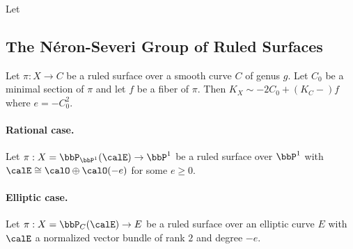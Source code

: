     \begin{theorem}\label{thm:classification_of_ruled_surface_on_elliptic_curve}
        Let 
        
    \end{theorem}


\subsection{The N\'eron-Severi Group of Ruled Surfaces}

    \begin{proposition}\label{prop:canonical_divisor_of_ruled_surface}
        Let \(\pi:X \to C\) be a ruled surface over a smooth curve \(C\) of genus \(g\). 
        Let \(C_0\) be a minimal section of \(\pi\) and let \(f\) be a fiber of \(\pi\). 
        Then \(K_X \sim -2C_0 + (K_C-)f\) where \(e = -C_0^2\).
    \end{proposition}

    \paragraph{Rational case.} Let \(\pi:X = \bbP_{\bbP^1}(\calE) \to \bbP^1\) be a ruled surface over \(\bbP^1\) with \(\calE \cong \calO \oplus \calO(-e)\) for some \(e \geq 0\).

    \paragraph{Elliptic case.} Let \(\pi:X = \bbP_C(\calE) \to E\) be a ruled surface over an elliptic curve \(E\) with \(\calE\) a normalized vector bundle of rank \(2\) and degree \(-e\).

        

